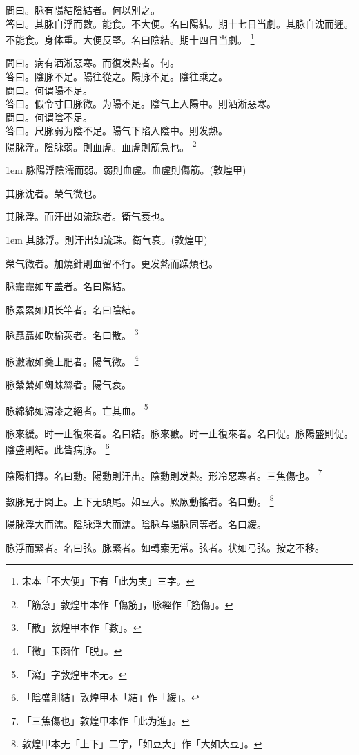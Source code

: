 問曰。脉有陽結陰結者。何以別之。\\
答曰。其脉{\khaaitp 自}浮而數。能食。不大便。名曰陽結。期十七日当劇。其脉{\khaaitp 自}沈而遲。不能食。身体重。大便反堅。名曰陰結。期十四日当劇。
	\footnote{宋本「不大便」下有「此为実」三字。}

問曰。病有洒淅惡寒。而復发熱者。何。\\
答曰。陰脉不足。陽往從之。陽脉不足。陰往乘之。\\
問曰。何谓陽不足。\\
答曰。假令寸口脉微。为陽不足。陰气上入陽中。則洒淅惡寒。\\
問曰。何谓陰不足。\\
答曰。尺脉弱为陰不足。陽气下陷入陰中。則发熱。\\

陽脉浮。陰脉弱。則血虗。血虗則筋急也。
	\footnote{「筋急」敦煌甲本作「傷筋」，脉經作「筋傷」。}

\hangindent 1em
脉陽浮陰濡而弱。弱則血虗。血虗則傷筋。(敦煌甲)

其脉沈者。榮气微也。

其脉浮。而汗出如流珠者。衛气衰也。

\hangindent 1em
其脉浮。則汗出如流珠。衛气衰。(敦煌甲)

榮气微者。加燒針則血留不行。更发熱而躁煩也。

脉靄靄如车盖者。名曰陽結。

脉累累如順长竿者。名曰陰結。

脉聶聶如吹榆莢者。名曰散。
	\footnote{「散」敦煌甲本作「數」。}

脉潎潎如羹上肥者。陽气微。
	\footnote{「微」玉函作「脱」。}

脉縈縈如蜘蛛絲者。陽气衰。

脉綿綿如{\khaaitp 瀉}漆之絕者。亡其血。
	\footnote{「瀉」字敦煌甲本无。}

脉來緩。时一止復來者。名曰結。脉來數。时一止復來者。名曰促。脉陽盛則促。陰盛則結。此皆病脉。
	\footnote{「陰盛則結」敦煌甲本「結」作「緩」。}

陰陽相摶。名曰動。陽動則汗出。陰動則发熱。形冷惡寒者。三焦傷也。
	\footnote{「三焦傷也」敦煌甲本作「此为進」。}

數脉見于関上。{\khaaitp 上下}无頭尾。如豆大。厥厥動搖者。名曰動。
	\footnote{敦煌甲本无「上下」二字，「如豆大」作「大如大豆」。}

陽脉浮大而濡。陰脉浮大而濡。陰脉与陽脉同等者。名曰緩。

脉浮而緊者。名曰弦。脉緊者。如轉索无常。弦者。状如弓弦。按之不移。

